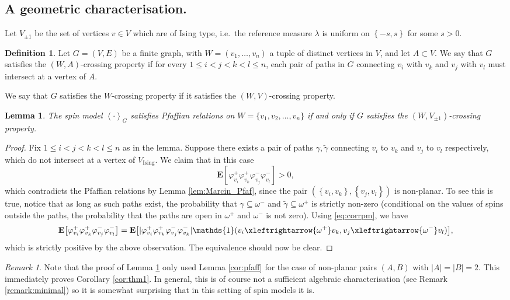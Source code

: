 \documentclass{article}
\newtheorem{lemma}[theorem]{Lemma}
\numberwithin{equation}{section}
\theoremstyle{definition}
\theoremstyle{definition}
\newtheorem{definition}{Definition}
\theoremstyle{remark}
\newtheorem{remark}{Remark}
\newcommand{\con}[1]{ \xleftrightarrow{#1}}
\newcommand{\E}{\mathbb{E}}
\newcommand{\id}{\mathds{1}}
\newcommand\vp{\varphi}
\renewcommand{\l}{\lambda}
\renewcommand{\E}{\mathrm{\mathbf{E}}}
\newcommand{\Vis}{V_{\mathrm{Ising}}}
\renewcommand{\Vis}{V_{\pm 1}}
\begin{document}
\subsection{A geometric characterisation. }
Let $\Vis$ be the set of vertices $v \in V$ which are of Ising type, i.e.~the reference measure $\l$ is uniform on $\left\{ -s,s \right\}$ for some $s > 0$.

\begin{definition}\label{def:Wcross}
    Let $G = (V, E)$ be a finite graph, with $W = (v_1, \ldots, v_{n})$ a tuple of distinct vertices in $V$, and let $A\subset V$. 
    We say that $G$ satisfies the $(W,A)$-crossing property if for every $1 \leq i < j < k < l \leq n$, each pair of paths in $G$ connecting $v_i$ with $v_k$ and $v_j$ with $v_l$ must intersect at a vertex of $A$. 
\end{definition}
We say that $G$ satisfies the $W$-crossing property if it satisfies the $(W,V)$-crossing property.

\begin{lemma}\label{lemma:keylemma}
    The spin model $\left< \cdot \right>_G$ satisfies Pfaffian relations on $W = \{v_1,v_2,\ldots, v_n \}$ if and only if $G$ satisfies the $(W,\Vis)$-crossing property.
\end{lemma}
\begin{proof}
    Fix $1 \leq i < j < k < l \leq n$ as in the lemma. 
    Suppose there exists a pair of paths $\gamma, \tilde \gamma$ connecting $v_i$ to $v_k$ and $v_j$ to $v_l$ respectively, which do not intersect at a vertex of $V_{\mathrm{Ising}}$. 
    We claim that in this case
    \begin{equation}\label{eq:nonvanish}
	    \E [ \vp^+_{v_i}\vp^+_{v_k} \vp^-_{v_j} \vp^-_{v_l} ] > 0, 
    \end{equation}
    which contradicts the Pfaffian relations by Lemma \ref{lem:Marcin_Pfaf}, since the pair $(\left\{v_i,v_k \right\},\left\{ v_j,v_l \right\})$ is non-planar.
   To see this is true, notice that as long as such paths exist, 
    the probability that $\gamma \subseteq \omega^-$ and $\tilde \gamma \subseteq \omega^+$ is strictly non-zero (conditional on the values of spins outside the paths, the probability that the paths are open in $\omega^+$ and $\omega^-$ is not zero). 
    Using \eqref{eq:corrpm}, we have
    \[
	    \E\big [ \vp^+_{v_i}\vp^+_{v_k} \vp^-_{v_j} \vp^-_{v_l} \big]
        = \E \big[ |\vp^+_{v_i}\vp^+_{v_k} \vp^-_{v_j} \vp^-_{v_k} 
        |\id (v_i \con{\omega^+} v_k,v_j \con{\omega^-} v_l )  \big], 
    \]
    which is strictly positive by the above observation. The equivalence should now be clear. 
\end{proof}
\begin{remark}
	Note that the proof of Lemma \ref{lemma:keylemma} only used Lemma \ref{cor:pfaff} for the case of non-planar pairs $(A,B)$ with $|A| = |B| = 2$. This immediately proves Corollary \ref{cor:thm1}. In general, this is of course not a sufficient algebraic characterisation (see Remark \ref{remark:minimal}) so it is somewhat surprising that in this setting of spin models it is. 
\end{remark}
\end{document}

